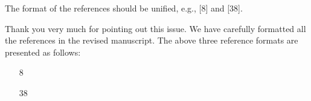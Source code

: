 \begin{Reviewer}
  \begin{ReviewerComment}
    The format of the references should be unified, e.g., [8]  and [38].
  \end{ReviewerComment}

  \begin{Response}
    Thank you very much for pointing out this issue.
    We have carefully formatted all the references in the revised manuscript.
    The above three reference formats are presented as follows:

    \begin{enumerate}
      \item[8] 

      \item[38] 
    \end{enumerate}
  \end{Response}

\end{Reviewer}